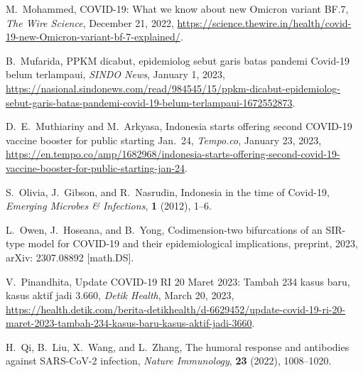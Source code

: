 \documentclass[11pt,reqno]{amsart}
\begin{document}
\begin{thebibliography}{99}
     M.\ Mohammed,
     \newblock COVID-19: What we know about new Omicron variant BF.7,
     \newblock \emph{The Wire Science}, December 21, 2022, \ul{https://science.thewire.in/health/covid-19-new-Omicron-variant-bf-7-explained/}.

     B.\ Mufarida,
     \newblock PPKM dicabut, epidemiolog sebut garis batas pandemi Covid-19 belum terlampaui,
     \newblock \emph{SINDO News}, January 1, 2023, \ul{https://nasional.sindonews.com/read/984545/15/ppkm-dicabut-epidemiolog-\linebreak sebut-garis-batas-pandemi-covid-19-belum-terlampaui-1672552873}.

     D.\ E.\ Muthiariny and M.\ Arkyasa,
     \newblock Indonesia starts offering second COVID-19 vaccine booster for public starting Jan.\ 24,
     \newblock \emph{Tempo.co}, January 23, 2023, \ul{https://en.tempo.co/amp/1682968/indonesia-starts-\linebreak offering-second-covid-19-vaccine-booster-for-public-starting-jan-24}.


     S.\ Olivia, J.\ Gibson, and R.\ Nasrudin,
     \newblock Indonesia in the time of Covid-19,
     \newblock \emph{Emerging Microbes \& Infections}, \textbf{1} (2012), 1--6.

     \newblock L.\ Owen, J.\ Hoseana, and B.\ Yong,
     \newblock Codimension-two bifurcations of an SIR-type model for COVID-19 and their epidemiological implications,
     \newblock preprint, 2023, arXiv: 2307.08892 [math.DS].

     V.\ Pinandhita,
     \newblock Update COVID-19 RI 20 Maret 2023: Tambah 234 kasus baru, kasus aktif jadi 3.660,
     \newblock \emph{Detik Health}, March 20, 2023, \ul{https://health.detik.com/berita-detikhealth/d-6629452/update-covid-19-ri-20-maret-2023-tambah-234-kasus-baru-kasus-aktif-jadi-3660}.

     H.\ Qi, B.\ Liu, X.\ Wang, and L.\ Zhang,
     \newblock The humoral response and antibodies against SARS-CoV-2 infection,
     \newblock \emph{Nature Immunology}, \textbf{23} (2022), 1008--1020.


\end{thebibliography}
\end{document}
